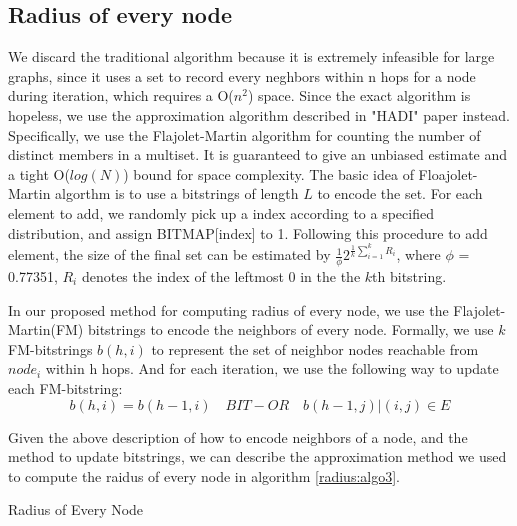 \subsection{Radius of every node}
We discard the traditional algorithm because it is extremely infeasible for large graphs, since it uses a set to record every neghbors within n hops for a node during iteration, which requires a O($n^2$) space.
Since the exact algorithm is hopeless, we use the approximation algorithm described in "HADI" paper\cite{DBLP:journals/tkdd/KangTAFL11} instead. Specifically, we use the Flajolet-Martin algorithm for counting the number of distinct members in a multiset. It is guaranteed to give an unbiased estimate and a tight O($log(N)$) bound for space complexity. The basic idea of Floajolet-Martin algorthm is to use a bitstrings of length $L$ to encode the set. For each element to add, we randomly pick up a index according to a specified distribution, and assign BITMAP[index] to 1. Following this procedure to add element, the size of the final set can be estimated by $\frac{1}{\phi} 2^{\frac{1}{k}\sum_{i=1}^k R_i}$, where $\phi$ = 0.77351, $R_i$ denotes the index of the leftmost 0 in the the $k$th bitstring.

In our proposed method for computing radius of every node, we use the Flajolet-Martin(FM) bitstrings to encode the neighbors of every node. Formally, we use $k$ FM-bitstrings $b(h, i)$ to represent the set of neighbor nodes reachable from $node_i$ within h hops. And for each iteration, we use the following way to update each FM-bitstring:$$b(h,i) = b(h-1,i)  \quad BIT-OR \quad  {b(h-1,j)|(i,j)\in E}$$

Given the above description of how to encode neighbors of a node, and the method to update bitstrings, we can describe the approximation method we used to compute the raidus of every node in algorithm \ref{radius:algo3}.

\begin{algorithm}
\caption{Radius of Every Node}
\begin{algorithmic}
\REPEAT
{}
\end{algorithmic}
\label{radius:algo3}
\end{algorithm}


